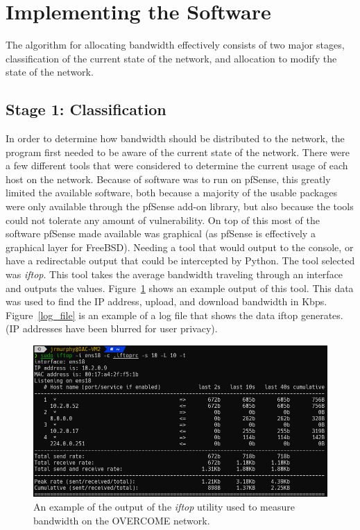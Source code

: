 \section{Implementing the Software}
The algorithm for allocating bandwidth effectively consists of two major stages, classification of the current state of the network, and allocation to modify the state of the network.

\subsection{Stage 1: Classification}
In order to determine how bandwidth should be distributed to the network, the program first needed to be aware of the current state of the network.
There were a few different tools that were considered to determine the current usage of each host on the network.
Because of software was to run on pfSense, this greatly limited the available software, both because a majority of the usable packages were only available through the pfSense add-on library, but also because the tools could not tolerate any amount of vulnerability.
On top of this most of the software pfSense made available was graphical (as pfSense is effectively a graphical layer for FreeBSD).
Needing a tool that would output to the console, or have a redirectable output that could be intercepted by Python.
The tool selected was \textit{iftop}.
This tool takes the average bandwidth traveling through an interface and outputs the values.
Figure~\ref{iftop_out} shows an example output of this tool. This data was used to find the IP address, upload, and download bandwidth in Kbps.
Figure~\ref{log_file} is an example of a log file that shows the data iftop generates. (IP addresses have been blurred for user privacy).\par
\begin{figure}[!ht]
    \centering
    \includegraphics[width=\textwidth,keepaspectratio]{Images/Chpt4/iftop_util.png}
    \caption{An example of the output of the \textit{iftop} utility used to measure bandwidth on the OVERCOME network.}
    \label{iftop_out}
\end{figure}
